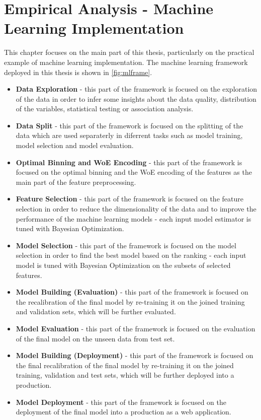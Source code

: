 \chapter{Empirical Analysis - Machine Learning Implementation}
\label{chap:five}
This chapter focuses on the main part of this thesis, particularly on the practical example of machine learning implementation. The machine learning framework deployed in this thesis is shown in \autoref{fig:mlframe}.
\begin{itemize}\setlength\itemsep{0em}
\item \textbf{Data Exploration} - this part of the framework is focused on the exploration of the data in order to infer some insights about the data quality, distribution of the variables, statistical testing or association analysis.
\item \textbf{Data Split} - this part of the framework is focused on the splitting of the data which are used separaterly in diferrent tasks such as model training, model selection and model evaluation.
\item \textbf{Optimal Binning and WoE Encoding} - this part of the framework is focused on the optimal binning and the WoE encoding of the features as the main part of the feature preprocessing.
\item \textbf{Feature Selection} - this part of the framework is focused on the feature selection in order to reduce the dimensionality of the data and to improve the performance of the machine learning models - each input model estimator is tuned with Bayesian Optimization.
\item \textbf{Model Selection} - this part of the framework is focused on the model selection in order to find the best model based on the ranking - each input model is tuned with Bayesian Optimization on the subsets of selected features.
\item \textbf{Model Building (Evaluation)} - this part of the framework is focused on the recalibration of the final model by re-training it on the joined training and validation sets, which will be further evaluated.
\item \textbf{Model Evaluation} - this part of the framework is focused on the evaluation of the final model on the unseen data from test set.
\item \textbf{Model Building (Deployment)} - this part of the framework is focused on the final recalibration of the final model by re-training it on the joined training, validation and test sets, which will be further deployed into a production.
\item \textbf{Model Deployment} - this part of the framework is focused on the deployment of the final model into a production as a web application.
\end{itemize}

